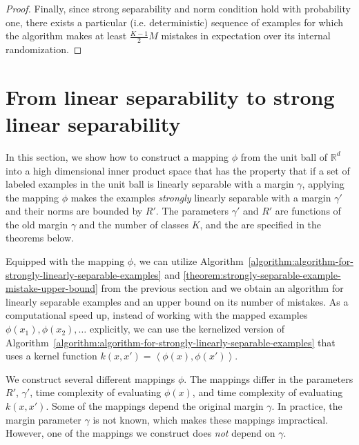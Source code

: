 \documentclass[12pt]{article}
\newcommand{\R}{\mathbb{R}}  %
\newcommand{\ip}[2]{\left\langle #1, #2 \right\rangle} %
\begin{document}
\begin{proof}
Finally, since strong separability and norm condition hold with probability one,
there exists a particular (i.e. deterministic) sequence of examples for which
the algorithm makes at least $\frac{K-1}{2} M$ mistakes in expectation
over its internal randomization.
\end{proof}

\section{From linear separability to strong linear separability}
\label{section:from-linear-separability-to-strong-linear-separability}

In this section, we show how to construct a mapping $\phi$ from the unit ball of
$\R^d$ into a high dimensional inner product space that has the property that if
a set of labeled examples in the unit ball is linearly separable with a margin
$\gamma$, applying the mapping $\phi$ makes the examples \emph{strongly}
linearly separable with a margin $\gamma'$ and their norms are bounded by $R'$.
The parameters $\gamma'$ and $R'$ are functions of the old margin $\gamma$ and
the number of classes $K$, and the are specified in the theorems below.

Equipped with the mapping $\phi$, we can utilize
Algorithm~\ref{algorithm:algorithm-for-strongly-linearly-separable-examples} and
\autoref{theorem:strongly-separable-example-mistake-upper-bound} from the
previous section and we obtain an algorithm for linearly separable examples and
an upper bound on its number of mistakes. As a computational speed up, instead
of working with the mapped examples $\phi(x_1), \phi(x_2), \dots$ explicitly, we
can use the kernelized version of
Algorithm~\ref{algorithm:algorithm-for-strongly-linearly-separable-examples}
that uses a kernel function $k(x,x') = \ip{\phi(x)}{\phi(x')}$.

We construct several different mappings $\phi$. The mappings differ in the
parameters $R'$, $\gamma'$, time complexity of evaluating $\phi(x)$, and time
complexity of evaluating $k(x,x')$. Some of the mappings depend the original
margin $\gamma$. In practice, the margin parameter $\gamma$ is not known, which
makes these mappings impractical. However, one of the mappings we construct
does \emph{not} depend on $\gamma$.
\end{document}
